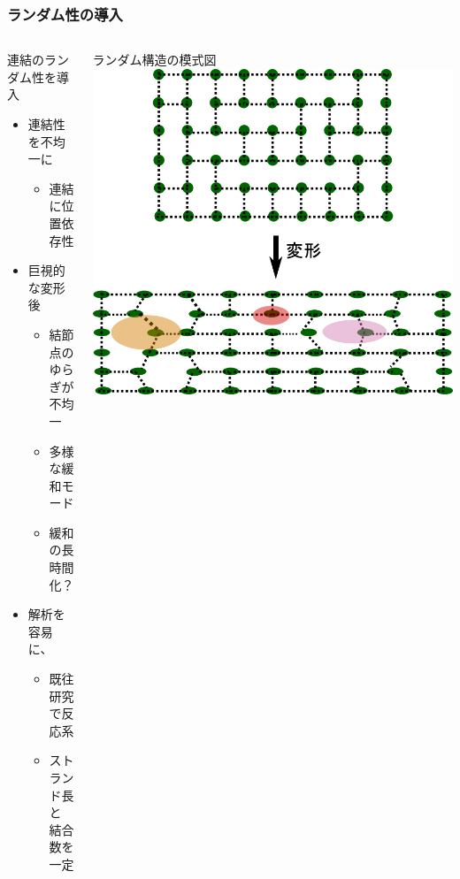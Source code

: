 \documentclass[aspectratio=169,11pt, dvipdfmx]{beamer}
\begin{document}
\begin{frame}
    \frametitle{ランダム性の導入}
    \vspace{-3mm}
		\begin{columns}[totalwidth=1\textwidth]
				\begin{block}{連結のランダム性を導入}
					\begin{itemize}
						\item 連結性を不均一に
							\begin{itemize}
								\item 連結に\alert{位置依存性}
							\end{itemize}
						\item 巨視的な変形後
							\begin{itemize}
								\item 結節点のゆらぎが\\不均一
								\item 多様な緩和モード
								\item \alert{緩和の長時間化？}
							\end{itemize}
						\item \alert{解析を容易}に、
                            \begin{itemize}
                                \item 既往研究で反応系
								\item \alert{ストランド長と\\結合数を一定}
							\end{itemize}
					\end{itemize}
				\end{block}
				ランダム構造の模式図
				\vspace{3mm}
				\includegraphics[width=\textwidth]{random_NW.png}
    \end{columns}
\end{frame}
\end{document}
